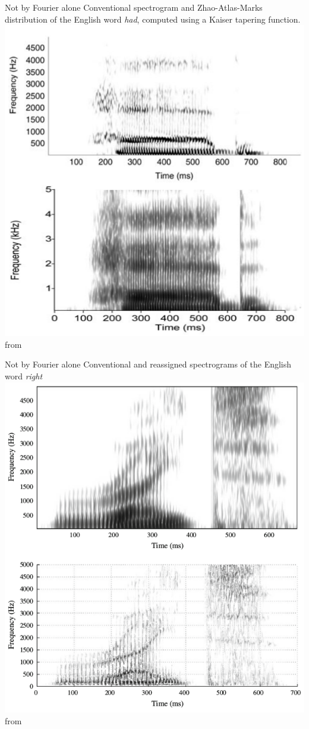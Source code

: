 \begin{frame}{Not by Fourier alone}
Conventional spectrogram and Zhao-Atlas-Marks distribution of the English word \textit{had}, computed using a Kaiser tapering function.
\includegraphics[width=0.63\linewidth]{20-ZAM} from \cite[119]{fulop11}
\end{frame}


\begin{frame}{Not by Fourier alone}
Conventional and reassigned spectrograms of the English word \textit{right}
\includegraphics[width=0.63\linewidth]{21-reassigned-spectrum} from \cite[142]{fulop11}
\end{frame}

